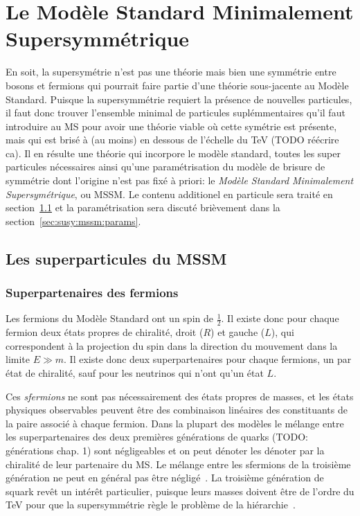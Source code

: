 
\section{Le Modèle Standard Minimalement Supersymmétrique}
\label{sec:susy:mssm}

En soit, la supersymétrie n'est pas une théorie mais bien une
symmétrie entre bosons et fermions qui pourrait faire partie d'une
théorie sous-jacente au Modèle Standard. Puisque la supersymmétrie
requiert la présence de nouvelles particules, il faut donc trouver
l'ensemble minimal de particules suplémmentaires qu'il faut introduire
au MS pour avoir une théorie viable où cette symétrie est présente,
mais qui est brisé à (au moins) en dessous de l'échelle du TeV (TODO
réécrire ca). Il en résulte une théorie qui incorpore le modèle
standard, toutes les super particules nécessaires ainsi qu'une
paramétrisation du modèle de brisure de symmétrie dont l'origine n'est
pas fixé à priori: le \emph{Modèle Standard Minimalement
  Supersymétrique}, ou MSSM. Le contenu additionel en particule sera
traité en section~\ref{sec:susy:mssm:sparticules} et la
paramétrisation sera discuté brièvement dans la
section~\ref{sec:susy:mssm:params}.

\subsection{Les superparticules du MSSM}
\label{sec:susy:mssm:sparticules}

\subsubsection{Superpartenaires des fermions}

Les fermions du Modèle Standard ont un spin de $\frac{1}{2}$. Il
existe donc pour chaque fermion deux états propres de chiralité, droit
($R$) et gauche ($L$), qui correspondent à la projection du spin dans
la direction du mouvement dans la limite $E \gg m$. Il existe donc
deux superpartenaires pour chaque fermions, un par état de chiralité,
sauf pour les neutrinos qui n'ont qu'un état $L$. 

Ces \emph{sfermions} ne sont pas nécessairement des états propres de
masses, et les états physiques observables peuvent être des
combinaison linéaires des constituants de la paire associé à chaque
fermion. Dans la plupart des modèles le mélange entre les
superpartenaires des deux premières générations de quarks (TODO:
générations chap. 1) sont négligeables et on peut dénoter les dénoter
par la chiralité de leur partenaire du MS. Le mélange entre les
sfermions de la troisième génération ne peut en général pas être
négligé~\cite{aad_summary_2015}. La troisième génération de squark
revêt un intérêt particulier, puisque leurs masses doivent être de
l'ordre du TeV pour que la supersymmétrie règle le problème de la
hiérarchie~\cite{olive_review_2014}.

